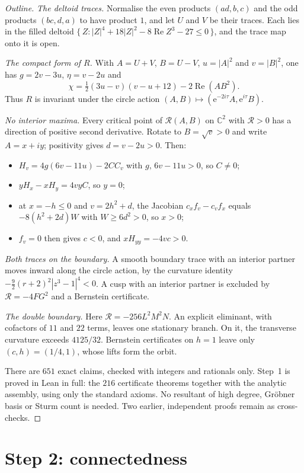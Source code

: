 \documentclass[11pt]{article}
\theoremstyle{remark}
\newcommand{\e}{\mathrm e}
\begin{document}
\begin{proof}[Outline]
\emph{The deltoid traces.} Normalise the even products $(ad,b,c)$ and the odd products $(bc,d,a)$ to have product $1$, and let $U$ and $V$ be their traces. Each lies in the filled deltoid $\{\,Z:|Z|^4+18|Z|^2-8\operatorname{Re}Z^3-27\le0\,\}$, and the trace map onto it is open.

\emph{The compact form of $R$.} With $A=U+V$, $B=U-V$, $u=|A|^2$ and $v=|B|^2$, one has $g=2v-3u$, $\eta=v-2u$ and
\[
 \chi=\tfrac12(3u-v)(v-u+12)-2\operatorname{Re}(AB^2).
\]
Thus $R$ is invariant under the circle action $(A,B)\mapsto(\e^{-2i\tau}A,\e^{i\tau}B)$.

\emph{No interior maxima.} Every critical point of $\mathcal R(A,B)$ on $\mathbb C^2$ with $\mathcal R>0$ has a direction of positive second derivative. Rotate to $B=\sqrt v>0$ and write $A=x+iy$; positivity gives $d=v-2u>0$. Then:
\begin{itemize}
\item $H_v=4g(6v-11u)-2CC_v$ with $g,\,6v-11u>0$, so $C\neq0$;
\item $yH_x-xH_y=4vyC$, so $y=0$;
\item at $x=-h\le0$ and $v=2h^2+d$, the Jacobian $c_xf_v-c_vf_x$ equals $-8(h^2+2d)W$ with $W\ge6d^2>0$, so $x>0$;
\item $f_v=0$ then gives $c<0$, and $xH_{yy}=-4vc>0$.
\end{itemize}

\emph{Both traces on the boundary.} A smooth boundary trace with an interior partner moves inward along the circle action, by the curvature identity $-\tfrac92(r+2)^2|z^3-1|^4<0$. A cusp with an interior partner is excluded by $\mathcal R=-4FG^2$ and a Bernstein certificate.

\emph{The double boundary.} Here $\mathcal R=-256L^2M^2N$. An explicit eliminant, with cofactors of $11$ and $22$ terms, leaves one stationary branch. On it, the transverse curvature exceeds $4125/32$. Bernstein certificates on $h=1$ leave only $(c,h)=(1/4,1)$, whose lifts form the orbit.

There are $651$ exact claims, checked with integers and rationals only. Step~1 is proved in Lean in full: the $216$ certificate theorems together with the analytic assembly, using only the standard axioms. No resultant of high degree, Gr\"obner basis or Sturm count is needed. Two earlier, independent proofs remain as cross-checks.
\end{proof}

\section{Step 2: connectedness}
\end{document}
